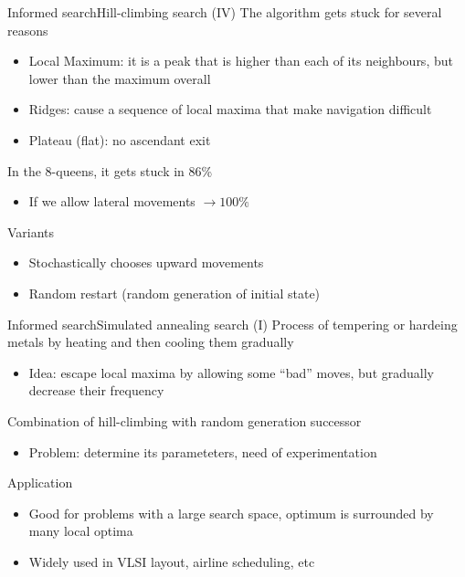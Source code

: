 \documentclass[10pt,compress]{beamer} %
\begin{document}
\begin{frame}{Informed search}{Hill-climbing search (IV)}
    The algorithm gets stuck for several reasons
    \begin{itemize}
        \item Local Maximum: it is a peak that is higher than each of its neighbours, but lower than the maximum overall
        \item Ridges: cause a sequence of local maxima that make navigation difficult
        \item Plateau (flat): no ascendant exit 
    \end{itemize}
    In the 8-queens, it gets stuck in 86\%
    \begin{itemize}
        \item If we allow lateral movements $\rightarrow 100\%$
    \end{itemize}
    Variants
    \begin{itemize}
        \item Stochastically chooses upward movements
        \item Random restart (random generation of initial state)
    \end{itemize}
\end{frame}

\begin{frame}{Informed search}{Simulated annealing search (I)}
    Process of tempering or hardeing metals by heating and then cooling them gradually
    \begin{itemize}
        \item Idea: escape local maxima by allowing some ``bad'' moves, but gradually decrease their frequency
    \end{itemize}
    
    Combination of hill-climbing with random generation successor
    \begin{itemize}
        \item Problem: determine its parameteters, need of experimentation
    \end{itemize}
    Application
    \begin{itemize}
        \item Good for problems with a large search space, optimum is surrounded by many local optima
        \item Widely used in VLSI layout, airline scheduling, etc
    \end{itemize}
\end{frame}
\end{document}
